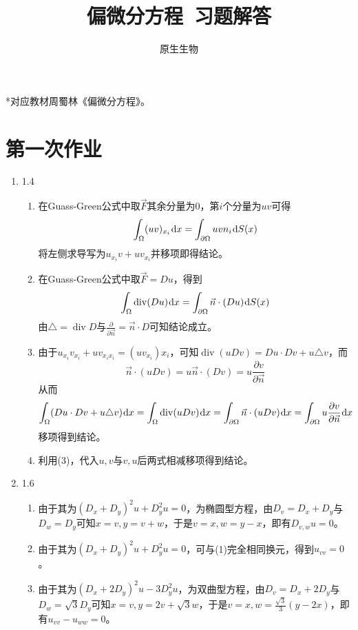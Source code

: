 \documentclass[a4paper,UTF8,fontset=windows,10pt]{ctexart}
\title{\heiti 偏微分方程\ 习题解答}
\author{原生生物}
\date{}
\newcommand*{\dr}{\hspace{0.07em}\mathrm{d}}
\DeclareMathOperator*{\di}{div}
\begin{document}
\maketitle

*对应教材周蜀林《偏微分方程》。

\tableofcontents

\newpage

\section{第一次作业}
\begin{enumerate}
    \item 1.4
    \begin{enumerate}[(1)]
        \item 在Guass-Green公式中取$\vec{F}$其余分量为0，第$i$个分量为$uv$可得
        $$\int_\Omega(uv)_{x_i}\dr x=\int_{\partial\Omega}uvn_i\dr S(x)$$
        将左侧求导写为$u_{x_i}v+uv_{x_i}$并移项即得结论。
    
        \item 在Guass-Green公式中取$\vec{F}=Du$，得到
        $$\int_\Omega\di(Du)\dr x=\int_{\partial\Omega}\vec{n}\cdot(Du)\dr S(x)$$
        由$\triangle=\di D$与$\frac{\partial}{\partial\vec{n}}=\vec{n}\cdot D$可知结论成立。
        
        \item 由于$u_{x_i}v_{x_i}+uv_{x_ix_i}=(uv_{x_i})x_i$，可知$\di(uDv)=Du\cdot Dv+u\triangle v$，而
        $$\vec{n}\cdot(uDv)=u\vec{n}\cdot(Dv)=u\frac{\partial v}{\partial\vec{n}}$$
        从而
        $$\int_\Omega(Du\cdot Dv+u\triangle v)\dr x=\int_\Omega\di(uDv)\dr x=\int_{\partial\Omega}\vec{n}\cdot(uDv)\dr x=\int_{\partial\Omega}u\frac{\partial v}{\partial\vec{n}}\dr x$$
        移项得到结论。
    
        \item 利用(3)，代入$u,v$与$v,u$后两式相减移项得到结论。
    \end{enumerate}
    
    \item 1.6
    \begin{enumerate}[(1)]
        \item 由于其为$(D_x+D_y)^2u+D_y^2u=0$，为椭圆型方程，由$D_v=D_x+D_y$与$D_w=D_y$可知$x=v,y=v+w$，于是$v=x,w=y-x$，即有$D_{v,w}u=0$。
        \item 由于其为$(D_x+D_y)^2u+D_y^2u=0$，可与(1)完全相同换元，得到$u_{vv}=0$。
        \item 由于其为$(D_x+2D_y)^2u-3D_y^2u$，为双曲型方程，由$D_v=D_x+2D_y$与$D_w=\sqrt3D_y$可知$x=v,y=2v+\sqrt3w$，于是$v=x,w=\frac{\sqrt3}{3}(y-2x)$，即有$u_{vv}-u_{ww}=0$。
    \end{enumerate}
    

\end{enumerate}
\end{document}
